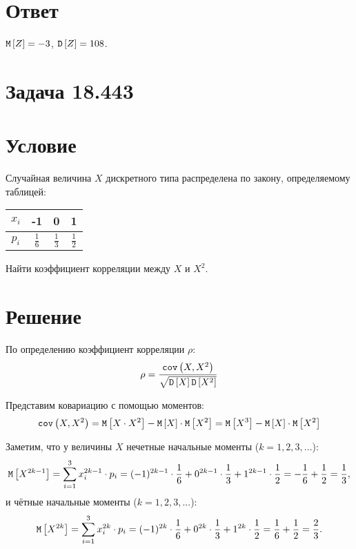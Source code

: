 \section*{Ответ}
$\mathtt{M} \left [ Z \right ] = -3$, $\mathtt{D} \left [ Z \right ] = 108$.


\section{Задача 18.443}
\section*{Условие}
Случайная величина $X$ дискретного типа распределена по закону, определяемому таблицей:

\begin{tabular}{|c|c|c|c|}
    \hline
    $x_i$ & -1            & 0             & 1             \\
    \hline
    $p_i$ & $\frac{1}{6}$ & $\frac{1}{3}$ & $\frac{1}{2}$ \\
    \hline
\end{tabular}

Найти коэффициент корреляции между $X$ и $X^2$.
\section*{Решение}
По определению коэффициент корреляции $\rho$:
\begin{equation}
    \rho = \frac{\texttt{cov} \left ( X , X^2 \right )}{\sqrt{\mathtt{D} \left [ X \right ] \mathtt{D} \left [ X^2 \right ]}}
\end{equation}

Представим ковариацию с помощью моментов:
\begin{equation}
    \texttt{cov} \left ( X , X^2 \right )
    = \mathtt{M} \left [ X \cdot X^2 \right ] - \mathtt{M} \left [ X \right ] \cdot \mathtt{M} \left [ X^2 \right ]
    = \mathtt{M} \left [ X^3 \right ] - \mathtt{M} \left [ X \right ] \cdot \mathtt{M} \left [ X^2 \right ]
\end{equation}

Заметим, что у величины $X$ нечетные начальные моменты ($k=1,2,3,...$):
\begin{equation}
    \mathtt{M} \left [ X^{2k-1} \right ] = \sum_{i=1}^3 x_i^{2k-1} \cdot p_i = (-1)^{2k-1} \cdot \frac{1}{6} + 0^{2k-1} \cdot \frac{1}{3} + 1^{2k-1} \cdot \frac{1}{2} = - \frac{1}{6} + \frac{1}{2} = \frac{1}{3} ,
\end{equation}
и чётные начальные моменты ($k=1,2,3,...$):
\begin{equation}
    \mathtt{M} \left [ X^{2k} \right ] = \sum_{i=1}^3 x_i^{2k} \cdot p_i = (-1)^{2k} \cdot \frac{1}{6} + 0^{2k} \cdot \frac{1}{3} + 1^{2k} \cdot \frac{1}{2} = \frac{1}{6} + \frac{1}{2} = \frac{2}{3} .
\end{equation}

